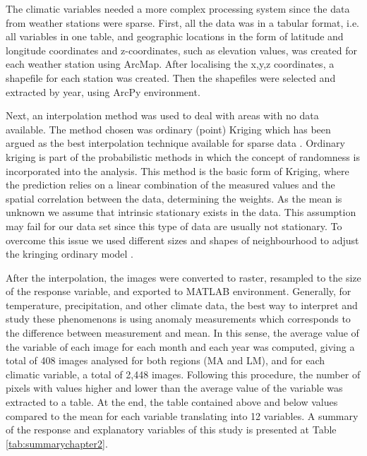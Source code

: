 The climatic variables needed a more complex processing system since the data from weather stations were sparse. First, all the data was in a tabular format, i.e. all variables in one table, and geographic locations in the form of latitude and longitude coordinates and z-coordinates, such as elevation values, was created for each weather station using ArcMap. After localising the x,y,z coordinates, a shapefile for each station was created. Then the shapefiles were selected and extracted by year, using ArcPy environment. 

Next, an interpolation method was used to deal with areas with no data available. The method chosen was ordinary (point) Kriging which has been argued as the best interpolation technique available for sparse data \citep{SLUITER_2009}. Ordinary kriging is part of the probabilistic methods in which the concept of randomness is incorporated into the analysis. This method is the basic form of Kriging, where the prediction relies on a linear combination of the measured values and the spatial correlation between the data, determining the weights. As the mean is unknown we assume that intrinsic stationary exists in the data. This assumption may fail for our data set since this type of data are usually not stationary. To overcome this issue we used different sizes and shapes of neighbourhood to adjust the kringing ordinary model \citep{SLUITER_2009}. 

After the interpolation, the images were converted to raster, resampled to the size of the response variable, and exported to MATLAB environment. Generally, for temperature, precipitation, and other climate data, the best way to interpret and study these phenomenons is using anomaly measurements which corresponds to the difference between measurement and mean. In this sense, the average value of the variable of each image for each month and each year was computed, giving a total of 408 images analysed for both regions (MA and LM), and for each climatic variable, a total of 2,448 images. Following this procedure, the number of pixels with values higher and lower than the average value of the variable was extracted to a table. At the end, the table contained above and below values compared to the mean for each variable translating into 12 variables. A summary of the response and explanatory variables of this study is presented at Table \ref{tab:summarychapter2}.


